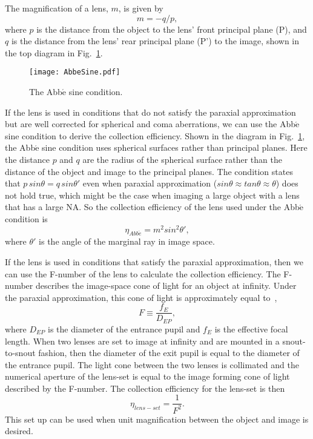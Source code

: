 The magnification of a lens, $m$, is given by
%
\begin{equation}
m = -q/p,
\label{eqn:magnification}
\end{equation}
%
where $p$ is the distance from the object to the lens' front principal plane (P), and $q$ is the distance from the lens' rear principal plane (P') to the image, shown in the top diagram in Fig.~\ref{fig:Abbe}.
%
\begin{figure}[h]
\texttt{[image: AbbeSine.pdf]}
\caption{The Abb$\acute{\mathrm{e}}$ sine condition.}
\label{fig:Abbe}
\end{figure}
%
If the lens is used in conditions that do not satisfy the paraxial approximation but are well corrected for spherical and coma aberrations, we can use the Abb$\acute{\mathrm{e}}$ sine condition to derive the collection efficiency.  Shown in the diagram in Fig.~\ref{fig:Abbe}, the Abb$\acute{\mathrm{e}}$ sine condition uses spherical surfaces rather than principal planes.  Here the distance $p$ and $q$ are the radius of the spherical surface rather than the distance of the object and image to the principal planes.  The condition states that $p \, sin \theta = q \, sin \theta'$ even when paraxial approximation ($sin \theta \approx tan \theta \approx \theta $) does not hold true, which might be the case when imaging a large object with a lens that has a large NA.  So the collection efficiency of the lens used under the Abb$\acute{\mathrm{e}}$ condition is
%
\begin{equation}
	\eta_{Abb\acute{e}} = m^2 sin^2 \theta',
\end{equation}
%
where $\theta'$ is the angle of the marginal ray in image space.

If the lens is used in conditions that satisfy the paraxial approximation, then we can use the F-number of the lens to calculate the collection efficiency.  The F-number describes the image-space cone of light for an object at infinity.  Under the paraxial approximation, this cone of light is approximately equal to~\citep{greivenkampfieldguide},
%
\begin{equation}
F \equiv \frac{f_E}{D_{EP}},
\end{equation}
%
where $D_{EP}$ is the diameter of the entrance pupil and $f_E$ is the effective focal length.  When two lenses are set to image at infinity and are mounted in a snout-to-snout fashion, then the diameter of the exit pupil is equal to the diameter of the entrance pupil.  The light cone between the two lenses is collimated and the numerical aperture of the lens-set is equal to the image forming cone of light described by the F-number.  The collection efficiency for the lens-set is then
%
\begin{equation}
\eta_{lens-set} = \frac{1}{F^2}.
\end{equation}
%
This set up can be used when unit magnification between the object and image is desired.

